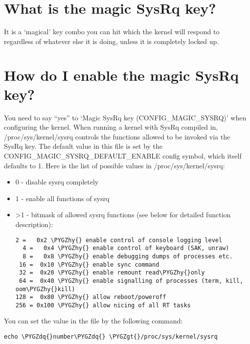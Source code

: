 \documentclass[a4paper,8pt,english]{sphinxmanual}
\def\PYGZgt{\char`\>}
\def\PYGZhy{\char`\-}
\def\PYGZdq{\char`\"}
\begin{document}
\section{What is the magic SysRq key?}
\label{admin-guide/sysrq:what-is-the-magic-sysrq-key}
It is a `magical' key combo you can hit which the kernel will respond to
regardless of whatever else it is doing, unless it is completely locked up.


\section{How do I enable the magic SysRq key?}
\label{admin-guide/sysrq:how-do-i-enable-the-magic-sysrq-key}
You need to say ``yes'' to `Magic SysRq key (CONFIG\_MAGIC\_SYSRQ)' when
configuring the kernel. When running a kernel with SysRq compiled in,
/proc/sys/kernel/sysrq controls the functions allowed to be invoked via
the SysRq key. The default value in this file is set by the
CONFIG\_MAGIC\_SYSRQ\_DEFAULT\_ENABLE config symbol, which itself defaults
to 1. Here is the list of possible values in /proc/sys/kernel/sysrq:
\begin{itemize}
\item {} 
0 - disable sysrq completely

\item {} 
1 - enable all functions of sysrq

\item {} 
\textgreater{}1 - bitmask of allowed sysrq functions (see below for detailed function
description):

\begin{Verbatim}[commandchars=\\\{\}]
  2 =   0x2 \PYGZhy{} enable control of console logging level
  4 =   0x4 \PYGZhy{} enable control of keyboard (SAK, unraw)
  8 =   0x8 \PYGZhy{} enable debugging dumps of processes etc.
 16 =  0x10 \PYGZhy{} enable sync command
 32 =  0x20 \PYGZhy{} enable remount read\PYGZhy{}only
 64 =  0x40 \PYGZhy{} enable signalling of processes (term, kill, oom\PYGZhy{}kill)
128 =  0x80 \PYGZhy{} allow reboot/poweroff
256 = 0x100 \PYGZhy{} allow nicing of all RT tasks
\end{Verbatim}

\end{itemize}

You can set the value in the file by the following command:

\begin{Verbatim}[commandchars=\\\{\}]
echo \PYGZdq{}number\PYGZdq{} \PYGZgt{}/proc/sys/kernel/sysrq
\end{Verbatim}
\end{document}
